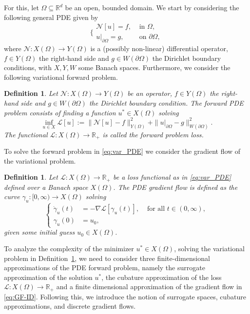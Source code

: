 \documentclass[pdflatex]{sn-jnl}%
\newtheorem{definition}[theorem]{Definition}
\begin{document}
For this, let $\Omega\subseteq \mathbb{R}^d$ be an open, bounded domain. We start by considering the following general PDE given by
\begin{equation}\label{eq:gen_PDE}
    \biggr\{\begin{array}{cc}
         \mathcal{N}[u] = f,& \textrm{ in }  \Omega,\\
         u|_{\partial\Omega} = g,& \textrm{ on }  \partial\Omega,
    \end{array}
\end{equation}
where $\mathcal{N}: X(\Omega)\rightarrow Y(\Omega)$ is a (possibly non-linear) differential operator, $f\in Y(\Omega)$ the right-hand side and $g\in W(\partial\Omega)$ the Dirichlet boundary conditions, with $X,Y,W$ some Banach spaces. Furthermore, we consider the following variational forward problem.
\begin{definition}\label{def:gen_pde_learning}
    Let $\mathcal{N}:X(\Omega)\rightarrow Y(\Omega)$ be an operator, $f\in Y(\Omega)$ the right-hand side and $g\in W(\partial\Omega)$ the Dirichlet boundary condition. The \emph{forward PDE problem} consists of finding a function $u^*\in X(\Omega)$ solving 
    \begin{equation}\label{eq:var_PDE}
    \inf\limits_{u\in X} \mathcal{L}[u]:= \|\mathcal{N}[u]-f\|_{Y(\Omega)}^2 + \|u|_{\partial\Omega}-g\|_{W(\partial\Omega)}^2.
\end{equation}
The functional $\mathcal{L}:X(\Omega)\rightarrow \mathbb{R}_{+}$ is called the \emph{forward problem loss}. 
\end{definition}
To solve the forward problem in \eqref{eq:var_PDE} we consider the gradient flow of the variational problem. 
\begin{definition}
    Let $\mathcal{L}:X(\Omega)\rightarrow \mathbb{R}_+$ be a loss functional as in \eqref{eq:var_PDE} defined over a Banach space $X(\Omega)$. The \emph{PDE gradient flow} is defined as the curve $\gamma_u:[0,\infty)\rightarrow X(
    \Omega
    )$ solving
    \begin{equation}\label{eq:GF-ID}
        \left\{\begin{aligned}
\dot{\gamma}_u(t) &= -\nabla \mathcal{L}[\gamma_u(t)], &\textrm{ for all } t \in (0, \infty), \\
\gamma_u(0) &= u_0,
\end{aligned}\right.
    \end{equation}
given some initial guess $u_0\in X(\Omega)$.
\end{definition}
To analyze the complexity of the minimizer $u^*\in X(\Omega)$, solving the variational problem in Definition~\ref{def:gen_pde_learning}, we need to consider three finite-dimensional approximations of the PDE forward problem, namely the surrogate approximation of the solution $u^*$, the cubature approximation of the loss $\mathcal{L}:X(\Omega)\rightarrow\mathbb{R}_+$ and a finite dimensional approximation of the gradient flow in \eqref{eq:GF-ID}. Following this, we introduce the notion of surrogate spaces, cubature approximations, and discrete gradient flows. 
\end{document}
